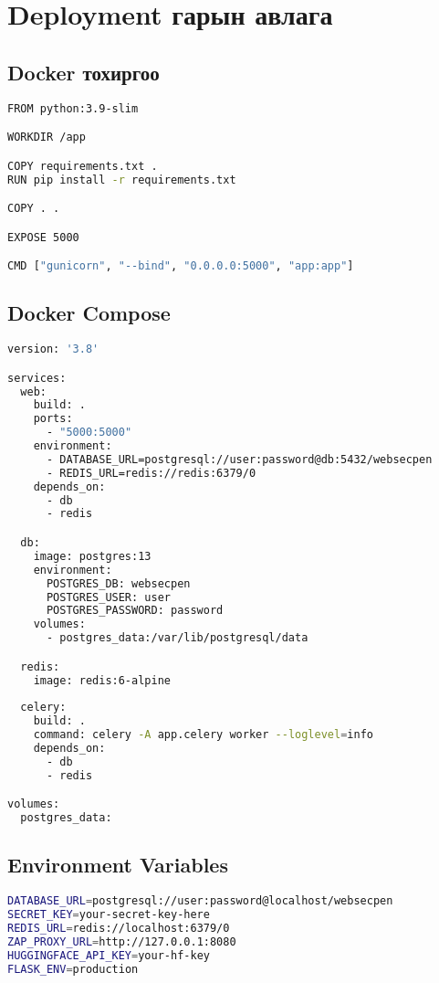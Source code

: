 \documentclass[main.tex]{subfiles}
\begin{document}
\chapter{Deployment гарын авлага}

\section{Docker тохиргоо}

\begin{lstlisting}[language=bash, caption=Dockerfile]
FROM python:3.9-slim

WORKDIR /app

COPY requirements.txt .
RUN pip install -r requirements.txt

COPY . .

EXPOSE 5000

CMD ["gunicorn", "--bind", "0.0.0.0:5000", "app:app"]
\end{lstlisting}

\section{Docker Compose}

\begin{lstlisting}[language=bash, caption=docker-compose.yml]
version: '3.8'

services:
  web:
    build: .
    ports:
      - "5000:5000"
    environment:
      - DATABASE_URL=postgresql://user:password@db:5432/websecpen
      - REDIS_URL=redis://redis:6379/0
    depends_on:
      - db
      - redis

  db:
    image: postgres:13
    environment:
      POSTGRES_DB: websecpen
      POSTGRES_USER: user
      POSTGRES_PASSWORD: password
    volumes:
      - postgres_data:/var/lib/postgresql/data

  redis:
    image: redis:6-alpine
    
  celery:
    build: .
    command: celery -A app.celery worker --loglevel=info
    depends_on:
      - db
      - redis

volumes:
  postgres_data:
\end{lstlisting}

\section{Environment Variables}

\begin{lstlisting}[language=bash, caption=Орчны хувьсагчид]
DATABASE_URL=postgresql://user:password@localhost/websecpen
SECRET_KEY=your-secret-key-here
REDIS_URL=redis://localhost:6379/0
ZAP_PROXY_URL=http://127.0.0.1:8080
HUGGINGFACE_API_KEY=your-hf-key
FLASK_ENV=production
\end{lstlisting}
\end{document}
